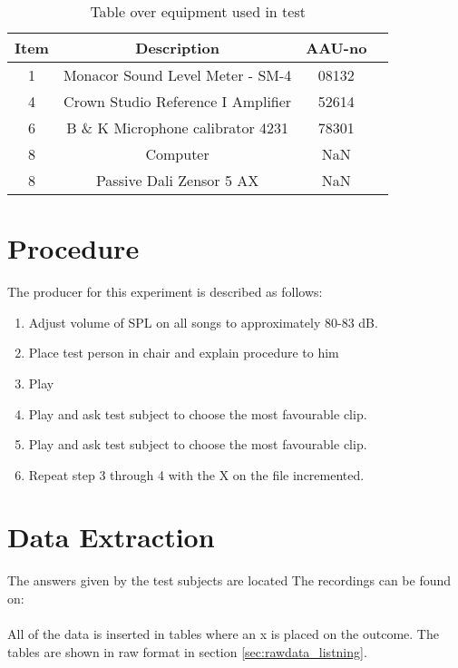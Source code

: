 \begin{table}[H]
\centering
{}
\begin{tabular}{S[table-format=1]ccc} \toprule
    {Item} & {Description} & {AAU-no} \\       &  Monacor Sound Level Meter - SM-4      & 08132   \\
    4      &  Crown Studio Reference I Amplifier    & 52614   \\
    6      &  B \& K Microphone calibrator 4231     & 78301   \\
    8      &  Computer                              & NaN     \\  
    8      &  Passive Dali Zensor 5 AX              & NaN     \\ \bottomrule 
\end{tabular}
\caption{Table over equipment used in test}
\label{tab:UsedEquipmentListning}
\end{table}



\section{Procedure}\label{sec:SpeakerTestProcedure3}

The producer for this experiment is described as follows:
\begin{enumerate}
\item Adjust volume of \gls{SPL} on all songs to approximately 80-83 dB.
\item Place test person in chair and explain procedure to him
\item Play 
\item Play  and ask test subject to choose the most favourable clip.
\item Play  and ask test subject to choose the most favourable clip.
\item Repeat step 3 through 4 with the X on the file incremented.
\end{enumerate}

\section{Data Extraction}
The answers given by the test subjects are located
The recordings can be found on:\\
\\
All of the data is inserted in tables where an x is placed on the outcome. The tables are shown in raw format in section \ref{sec:rawdata_listning}.



